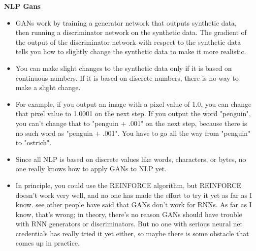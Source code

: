 \documentclass{article}
\begin{document}
\begin{center}
    {\Large{\textbf{NLP Gans}}}
\end{center}
\begin{itemize}
    \item GANs work by training a generator network that outputs synthetic data, then running a discriminator network on the synthetic data. The gradient of the output of the discriminator network with respect to the synthetic data tells you how to slightly change the synthetic data to make it more realistic.
    \item You can make slight changes to the synthetic data only if it is based on continuous numbers. If it is based on discrete numbers, there is no way to make a slight change.
    \item For example, if you output an image with a pixel value of 1.0, you can change that pixel value to 1.0001 on the next step. 
If you output the word "penguin", you can't change that to "penguin + .001" on the next step, because there is no such word as "penguin + .001". You have to go all the way from "penguin" to "ostrich".
    \item Since all NLP is based on discrete values like words, characters, or bytes, no one really knows how to apply GANs to NLP yet. 
    \item In principle, you could use the REINFORCE algorithm, but REINFORCE doesn't work very well, and no one has made the effort to try it yet as far as I know.
    \itemI see other people have said that GANs don't work for RNNs. As far as I know, that's wrong; in theory, there's no reason GANs should have trouble with RNN generators or discriminators. But no one with serious neural net credentials has really tried it yet either, so maybe there is some obstacle that comes up in practice.

\end{itemize}

\end{document}
